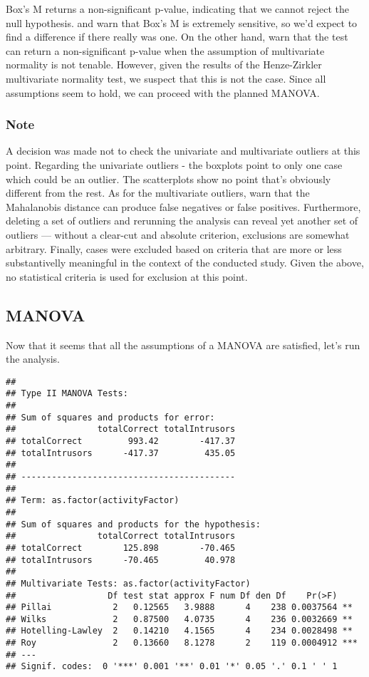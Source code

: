 \documentclass[12pt,]{article}
\begin{document}
Box's M returns a non-significant p-value, indicating that we cannot
reject the null hypothesis. \citet{field_discovering_2012} and
\citet{raykov_introduction_2008} warn that Box's M is extremely
sensitive, so we'd expect to find a difference if there really was one.
On the other hand, \citet{field_discovering_2012} warn that the test can
return a non-significant p-value when the assumption of multivariate
normality is not tenable. However, given the results of the
Henze-Zirkler multivariate normality test, we suspect that this is not
the case. Since all assumptions seem to hold, we can proceed with the
planned MANOVA.

\hypertarget{note}{%
\subsubsection{Note}\label{note}}

A decision was made not to check the univariate and multivariate
outliers at this point. Regarding the univariate outliers - the boxplots
point to only one case which could be an outlier. The scatterplots show
no point that's obviously different from the rest. As for the
multivariate outliers, \citet{tabachnick_using_2012} warn that the
Mahalanobis distance can produce false negatives or false positives.
Furthermore, deleting a set of outliers and rerunning the analysis can
reveal yet another set of outliers --- without a clear-cut and absolute
criterion, exclusions are somewhat arbitrary. Finally, cases were
excluded based on criteria that are more or less substantivelly
meaningful in the context of the conducted study. Given the above, no
statistical criteria is used for exclusion at this point.

\hypertarget{manova}{%
\subsection{MANOVA}\label{manova}}

Now that it seems that all the assumptions of a MANOVA are satisfied,
let's run the analysis.

\begin{verbatim}
## 
## Type II MANOVA Tests:
## 
## Sum of squares and products for error:
##                totalCorrect totalIntrusors
## totalCorrect         993.42        -417.37
## totalIntrusors      -417.37         435.05
## 
## ------------------------------------------
##  
## Term: as.factor(activityFactor) 
## 
## Sum of squares and products for the hypothesis:
##                totalCorrect totalIntrusors
## totalCorrect        125.898        -70.465
## totalIntrusors      -70.465         40.978
## 
## Multivariate Tests: as.factor(activityFactor)
##                  Df test stat approx F num Df den Df    Pr(>F)    
## Pillai            2   0.12565   3.9888      4    238 0.0037564 ** 
## Wilks             2   0.87500   4.0735      4    236 0.0032669 ** 
## Hotelling-Lawley  2   0.14210   4.1565      4    234 0.0028498 ** 
## Roy               2   0.13660   8.1278      2    119 0.0004912 ***
## ---
## Signif. codes:  0 '***' 0.001 '**' 0.01 '*' 0.05 '.' 0.1 ' ' 1
\end{verbatim}
\end{document}
